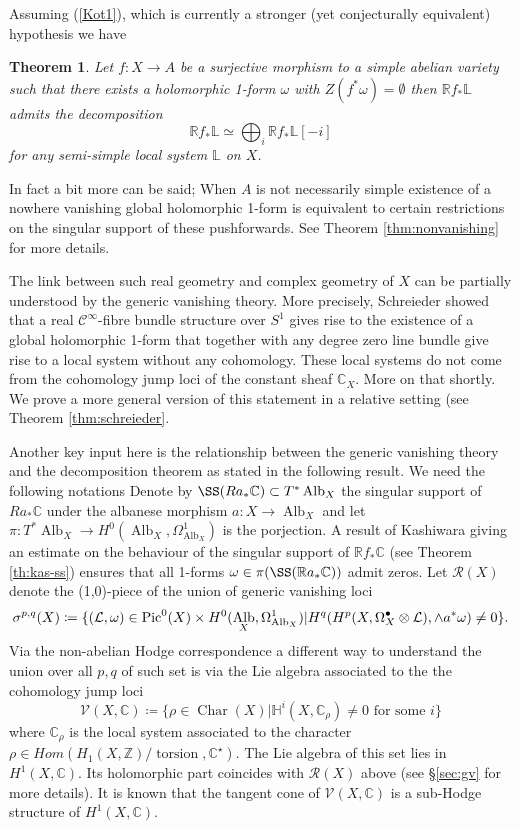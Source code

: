 \documentclass[12pt,reqno]{amsart}
\newtheorem{alphtheorem}{Theorem}
\theoremstyle{question}
\theoremstyle{definition}
\theoremstyle{remark}
\theoremstyle{cited}
\theoremstyle{citeddef}
\DeclareMathOperator{\Alb}{Alb}
\DeclareMathOperator{\Char}{Char}
\def\Pic{{\rm Pic}}
\newcommand{\sL}{\mathcal{L}}
\newcommand{\sR}{\mathcal{R}}
\newcommand\sV{{\mathcal V}}
\newcommand{\bbC}{\mathbb{C}}
\newcommand{\bbH}{\mathbb{H}}
\newcommand{\bbL}{\mathbb{L}}
\newcommand{\bbR}{\mathbb{R}}
\newcommand{\bbZ}{\mathbb{Z}}
\newcommand{\scrC}{\mathscr{C}}
\DeclareMathOperator{\torsion}{torsion}
\begin{document}
Assuming (\ref{Kot1}), which is currently a stronger (yet conjecturally
equivalent) hypothesis we have
\begin{alphtheorem}\label{thm:cxsmooth}
Let $f\colon X\to A$ be a surjective morphism to a simple abelian
variety such that there exists a holomorphic 1-form
$\omega$ with $Z(f^*\omega) = \emptyset$ then $\bbR f_*\bbL$
admits the decomposition
\[\bbR f_*\bbL \simeq \bigoplus_i \bbR f_*\bbL[-i]\]
for any semi-simple local system $\bbL$ on $X$. 
\end{alphtheorem}
In fact a bit more can be said; When $A$ is not necessarily simple existence of a nowhere vanishing global holomorphic 1-form
is equivalent to certain restrictions on the singular support of 
these pushforwards. See Theorem \ref{thm:nonvanishing} for more details. 

The link between such
 real geometry and complex geometry of $X$ can be partially
understood
by the generic vanishing theory. More precisely, Schreieder 
showed \cite[Theorem 1.2]{Sch19} that a real $\scrC^{\infty}$-fibre bundle structure over $S^1$ gives rise to the existence of 
a global
holomorphic 1-form that together with any degree zero line bundle give rise to a local system without any cohomology. These
local systems do not come from the cohomology jump loci of the constant sheaf $\bbC_X$. More on that shortly. We prove a more general
version of this statement in a relative setting (see Theorem
\ref{thm:schreieder}. 

 Another key input here is the relationship between the generic vanishing theory and the decomposition
theorem as stated in the following result. We need the following notations
Denote by $\SS(Ra_*\bbC)\subset T^*\Alb_X$ the singular support of $Ra_*\bbC$ under the albanese morphism $a\colon X\to \Alb_X$ and 
let $\pi\colon T^*\Alb_X\to 
H^0(\Alb_X, \Omega_{\Alb_X}^1)$ is the porjection. A result of
Kashiwara giving an estimate on the behaviour of the singular
support of $\bbR f_*\bbC$ (see
Theorem \ref{th:kas-ss}) ensures that all 1-forms
$\omega\in \pi(\SS(\bbR a_*\bbC))$ admit zeros. Let $\sR(X)$ denote the (1,0)-piece of the union of generic vanishing loci
\[\sigma^{p,q}(X) \coloneqq \{(\sL,\omega)\in \Pic^0(X)\times H^0(\Alb_X,\Omega_{\Alb_X}^1)|H^q(H^{p}(X, \Omega_X^{\bullet}\otimes \sL), \wedge a^*\omega) \neq 0\}.\]
Via the non-abelian Hodge correspondence a different way to understand the union over all $p,q$ of such set is via the Lie algebra associated to the  the cohomology jump loci 
\[\sV(X,\bbC) \coloneqq \{\rho\in\Char(X)| \bbH^i(X, \bbC_{\rho})\neq  0\text{ for some } i\} \]
where $\bbC_{\rho}$ is the local system associated 
to the character $\rho\in Hom(H_1(X,\bbZ)/\torsion, \bbC^{\star})$.
The Lie algebra of this set lies in $H^1(X,\bbC)$. Its holomorphic part coincides with $\sR(X)$ above
(see \S \ref{sec:gv} for more details). It is known that the tangent cone of $\sV(X,\bbC)$ is a sub-Hodge structure of $H^1(X,\bbC)$.
\end{document}
